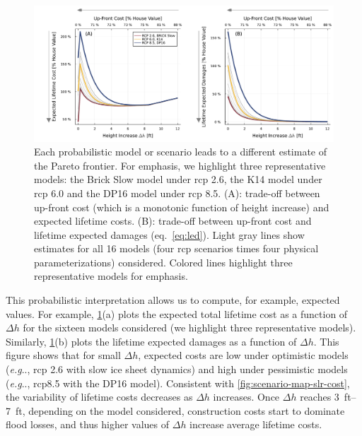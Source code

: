 \documentclass[11pt]{article}
\makeatletter
\DeclareRobustCommand\onedot{\futurelet\@let@token\@onedot}
\def\@onedot{\ifx\@let@token.\else.\null\fi\xspace}
\def\eg{\emph{e.g}\onedot} \def\Eg{\emph{E.g}\onedot}
\DeclareRobustCommand\onedot{\futurelet\@let@token\@onedot}
\def\@onedot{\ifx\@let@token.\else.\null\fi\xspace}
\def\eg{\emph{e.g}\onedot} \def\Eg{\emph{E.g}\onedot}
\makeatother
\begin{document}
\begin{figure}
    \centering
    \includegraphics[width=\textwidth]{tradeoffs-by-rcp}
    \caption{
        Each probabilistic model or scenario leads to a different estimate of the Pareto frontier.
        For emphasis, we highlight three representative models: the Brick Slow model \citep{wong_brick0.2:2017} under \gls{rcp} 2.6, the K14 \citep{kopp_probabilistic:2014} model under \gls{rcp} 6.0 and the DP16 model \citep{deconto_antarctica:2016,kolpin_introduction:2017} under \gls{rcp} 8.5.
        (A): trade-off between up-front cost (which is a monotonic function of height increase) and expected lifetime costs.
        (B): trade-off between up-front cost and lifetime expected damages (eq.~\ref{eq:led}).
        Light gray lines show estimates for all 16 models (four \gls{rcp} scenarios times four physical parameterizations) considered.
        Colored lines highlight three representative models for emphasis.
    }\label{fig:tradeoffs-by-rcp}
\end{figure}

This probabilistic interpretation allows us to compute, for example, expected values.
For example, \cref{fig:tradeoffs-by-rcp}(a) plots the expected total lifetime cost as a function of $\Delta h$ for the sixteen models considered (we highlight three representative models).
Similarly, \cref{fig:tradeoffs-by-rcp}(b) plots the lifetime expected damages as a function of $\Delta h$.
This figure shows that for small $\Delta h$, expected costs are low under optimistic models (\eg, \gls{rcp} 2.6 with slow ice sheet dynamics) and high under pessimistic models (\eg, \gls{rcp}8.5 with the DP16 model).
Consistent with \cref{fig:scenario-map-slr-cost}, the variability of lifetime costs decreases as $\Delta h$ increases.
Once $\Delta h$ reaches \SIrange[]{3}{7}{ft}, depending on the model considered, construction costs start to dominate flood losses, and thus higher values of $\Delta h$ increase average lifetime costs.
\end{document}
